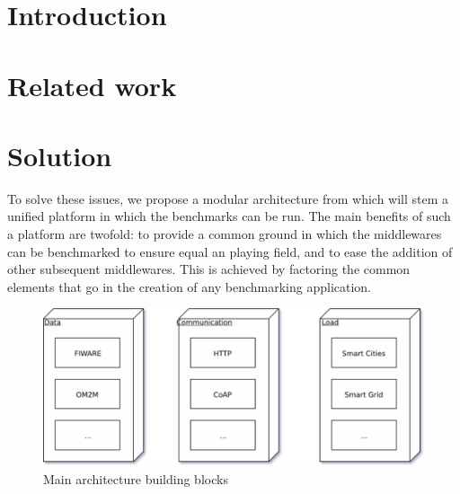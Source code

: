 \documentclass[conference]{IEEEtran}
\begin{document}
\title{}


\author{}


\maketitle

\begin{abstract}
\end{abstract}

\section{Introduction}


\section{Related work}


\section{Solution}

To solve these issues, we propose a modular architecture from which will stem a unified platform in which the benchmarks can be run. The main benefits of such a platform are twofold: to provide a common ground in which the middlewares can be benchmarked to ensure equal an playing field, and to ease the addition of other subsequent middlewares. This is achieved by factoring the common elements that go in the creation of any benchmarking application.

\begin{figure}[htbp!]
  \centering
  \includegraphics[width=\linewidth]{figures/benchmark_blocks.eps}
  \caption{Main architecture building blocks}
  \label{fig:main_building_blocks}
\end{figure}
%
\end{document}
